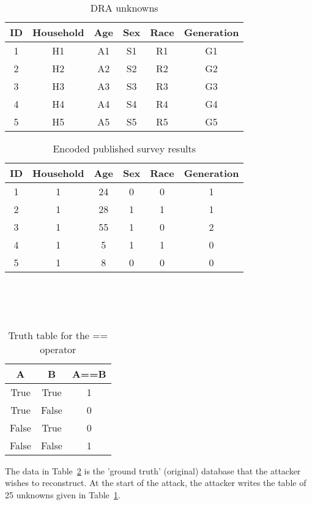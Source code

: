 \documentclass[5p,times,11pt]{elsarticle}
\begin{document}
\begin{table}[h]
\begin{tabular}{c|c|c|c|c|c}
ID & Household & Age & Sex & Race & Generation \\
\hline
1 & H1 & A1 & S1 & R1 & G1  \\
2 & H2 & A2 & S2 & R2 & G2  \\
3 & H3 & A3 & S3 & R3 & G3  \\
4 & H4 & A4 & S4 & R4 & G4  \\
5 & H5 & A5 & S5 & R5 & G5  \\
\hline
\end{tabular}
\caption{DRA unknowns}\label{unknownssmall}
\end{table}

\begin{table}[h]
\begin{tabular}{c|c|c|c|c|c}
ID & Household & Age & Sex & Race & Generation \\
\hline
1 & 1 & 24 & 0 & 0 & 1  \\
2 & 1 & 28 & 1 & 1 & 1  \\
3 & 1 & 55 & 1 & 0 & 2  \\
4 & 1 & 5 & 1 & 1 & 0  \\
5 & 1 & 8 & 0 & 0 & 0  \\
\hline
\end{tabular}
\\
\\
\\

\caption{Encoded published survey results}\label{resultsencodedsmall}
\end{table}

\begin{table}[t]
\begin{tabular}{cc|c}
A & B & A==B  \\
\hline
True & True & 1   \\
True & False & 0  \\
False & True & 0  \\
False & False & 1  \\
\hline
\end{tabular}
\caption{Truth table for the == operator}\label{truthtable}
\end{table}

The data in Table~\ref{resultsencodedsmall} is the 'ground truth' (original) database that the attacker wishes to reconstruct. At the start of the attack, the attacker writes the table of 25 unknowns given in Table~\ref{unknownssmall}.
\end{document}
